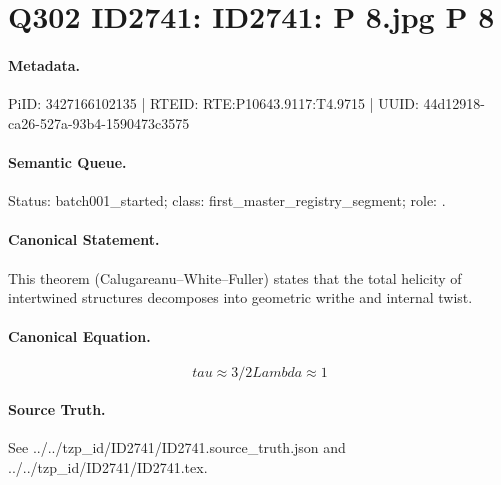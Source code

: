 \section*{Q302 ID2741: ID2741: P 8.jpg P 8}
\paragraph{Metadata.}
PiID: 3427166102135 | RTEID: RTE:P10643.9117:T4.9715 | UUID: 44d12918-ca26-527a-93b4-1590473c3575

\paragraph{Semantic Queue.}
Status: batch001\_started; class: first\_master\_registry\_segment; role: .

\paragraph{Canonical Statement.}
This theorem (Calugareanu--White--Fuller) states that the total helicity of intertwined structures decomposes into geometric writhe and internal twist.

\paragraph{Canonical Equation.}
\[
tau \approx 3/2 Lambda \approx 1
\]

\paragraph{Source Truth.}
See ../../tzp\_id/ID2741/ID2741.source\_truth.json and ../../tzp\_id/ID2741/ID2741.tex.
